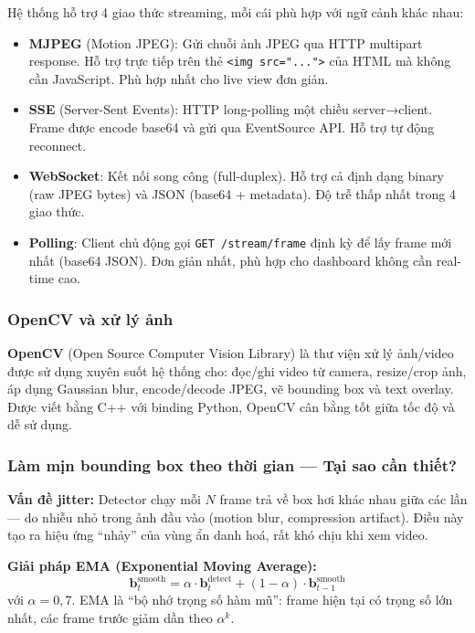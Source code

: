 Hệ thống hỗ trợ 4 giao thức streaming, mỗi cái phù hợp với ngữ cảnh khác nhau:

\begin{itemize}
    \item \textbf{MJPEG} (Motion JPEG): Gửi chuỗi ảnh JPEG qua HTTP multipart response. Hỗ trợ trực tiếp trên thẻ \texttt{<img src="...">} của HTML mà không cần JavaScript. Phù hợp nhất cho live view đơn giản.
    \item \textbf{SSE} (Server-Sent Events): HTTP long-polling một chiều server→client. Frame được encode base64 và gửi qua EventSource API. Hỗ trợ tự động reconnect.
    \item \textbf{WebSocket}: Kết nối song công (full-duplex). Hỗ trợ cả định dạng binary (raw JPEG bytes) và JSON (base64 + metadata). Độ trễ thấp nhất trong 4 giao thức.
    \item \textbf{Polling}: Client chủ động gọi \texttt{GET /stream/frame} định kỳ để lấy frame mới nhất (base64 JSON). Đơn giản nhất, phù hợp cho dashboard không cần real-time cao.
\end{itemize}

\subsubsection{OpenCV và xử lý ảnh}
\label{subsubsec:opencv}

\textbf{OpenCV} \cite{opencv} (Open Source Computer Vision Library) là thư viện xử lý ảnh/video được sử dụng xuyên suốt hệ thống cho: đọc/ghi video từ camera, resize/crop ảnh, áp dụng Gaussian blur, encode/decode JPEG, vẽ bounding box và text overlay. Được viết bằng C++ với binding Python, OpenCV cân bằng tốt giữa tốc độ và dễ sử dụng.

\subsubsection{Làm mịn bounding box theo thời gian --- Tại sao cần thiết?}
\label{subsubsec:bbox_smooth}

\textbf{Vấn đề jitter:} Detector chạy mỗi $N$ frame trả về box hơi khác nhau giữa các lần --- do nhiễu nhỏ trong ảnh đầu vào (motion blur, compression artifact). Điều này tạo ra hiệu ứng ``nhảy'' của vùng ẩn danh hoá, rất khó chịu khi xem video.

\textbf{Giải pháp EMA (Exponential Moving Average):}
\begin{equation}
    \mathbf{b}_t^{\text{smooth}} = \alpha \cdot \mathbf{b}_t^{\text{detect}} + (1 - \alpha) \cdot \mathbf{b}_{t-1}^{\text{smooth}}
\end{equation}
với $\alpha = 0{,}7$. EMA là ``bộ nhớ trọng số hàm mũ'': frame hiện tại có trọng số lớn nhất, các frame trước giảm dần theo $\alpha^k$.

